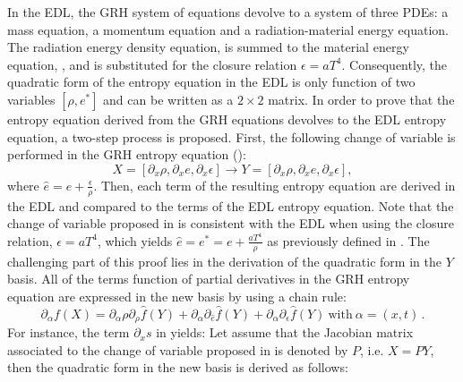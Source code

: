 \documentclass[times,doublespace]{fldauth}%
\begin{document}
In the EDL, the GRH system of equations devolve to a system of three PDEs: a mass equation, a momentum equation and a radiation-material energy equation. The radiation energy density equation,  is summed to the material energy equation, , and is substituted for the closure relation $\epsilon = aT^4$. Consequently, the quadratic form of the entropy equation in the EDL is only function of two variables $\left[ \rho, e^* \right]$ and can be written as a $2 \times 2$ matrix. In order to prove that the entropy equation derived from the GRH equations devolves to the EDL entropy equation, a two-step process is proposed. First, the following change of variable is performed in the GRH entropy equation ():
%
\begin{equation}\label{eq:chge_var}
X=\left[ \partial_x \rho, \partial_x e,  \partial_x \epsilon \right] \rightarrow Y=\left[ \partial_x \rho, \partial_x \hat{e},  \partial_x \epsilon \right], 
\end{equation}
%
where $\hat{e} = e + \frac{\epsilon}{\rho}$. Then, each term of the resulting entropy equation are derived in the EDL and compared to the terms of the EDL entropy equation. Note that the change of variable proposed in  is consistent with the EDL when using the closure relation, $\epsilon = a T^4$, which yields $\hat{e} = e^* = e + \frac{a T^4}{\rho}$ as previously defined in . The challenging part of this proof lies in the derivation of the quadratic form in the $Y$ basis. All of the terms function of partial derivatives in the GRH entropy equation are expressed in the new basis by using a chain rule: 
%
\begin{equation}
\partial_\alpha f(X) = \partial_\alpha \rho \partial_\rho \hat{f}(Y)+\partial_\alpha \partial_{\hat{e}} \hat{f}(Y)+\partial_\alpha \partial_{\epsilon} \hat{f}(Y) \ \text{with} \ \alpha=(x,t) \, .
\end{equation}
%
For instance, the term $\partial_x s$ in  yields: 
%
%
Let assume that the Jacobian matrix associated to the change of variable proposed in  is denoted by $P$, i.e. $X=PY$, then the quadratic form in the new basis is derived as follows:
\end{document}

